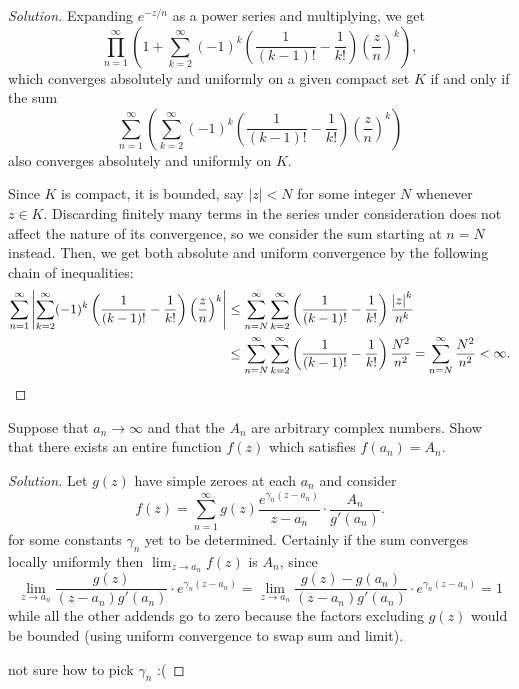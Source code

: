 \documentclass[10pt]{article}
\newenvironment{soln}{\begin{proof}[Solution]}{\end{proof}}
\providecommand{\abs}[1]{\left\lvert #1\right\rvert}
\providecommand{\paren}[1]{\left(#1\right)}
\begin{document}
\begin{soln}
    Expanding $e^{-z/n}$ as a power series and multiplying, we get
    \begin{equation*}
	\prod_{n=1}^\infty \paren{
	    1 + \sum_{k=2}^\infty (-1)^k\paren{\frac 1{(k-1)!} - \frac 1{k!}}
	    \paren{\frac zn}^k
	},
    \end{equation*}
    which converges absolutely and uniformly on a given compact set $K$
    if and only if the sum
    \begin{equation*}
	\sum_{n=1}^\infty
	\paren{\sum_{k=2}^\infty (-1)^k\paren{\frac 1{(k-1)!}
	- \frac 1{k!}} \paren{\frac zn}^k}
    \end{equation*}
    also converges absolutely and uniformly on $K$.

    Since $K$ is compact, it is bounded,
    say $\abs z < N$ for some integer $N$ whenever $z\in K$.
    Discarding finitely many terms in the series under consideration
    does not affect the nature of its convergence, so we consider
    the sum starting at $n = N$ instead. Then,
    we get both absolute and uniform convergence
    by the following chain of inequalities:
    \begin{align*}
	\sum_{n=1}^\infty
	\abs{\sum_{k=2}^\infty (-1)^k\paren{\frac 1{(k-1)!}
	- \frac 1{k!}} \paren{\frac zn}^k}
	&\le \sum_{n=N}^\infty\sum_{k=2}^\infty
	\paren{\frac 1{(k-1)!} - \frac 1{k!}}
	\frac{\abs z^k}{n^k}\\
	&\le \sum_{n=N}^\infty\sum_{k=2}^\infty
	\paren{\frac 1{(k-1)!} - \frac 1{k!}} \frac{N^2}{n^2}
	= \sum_{n=N}^\infty \frac{N^2}{n^2} < \infty.\qedhere
    \end{align*}
\end{soln}

\begin{problem}
    [p.197\#1]
    Suppose that $a_n\to\infty$ and that the $A_n$
    are arbitrary complex numbers. Show that there exists
    an entire function $f(z)$ which satisfies $f(a_n) = A_n$.
\end{problem}

\begin{soln}
    Let $g(z)$ have simple zeroes at each $a_n$ and consider
    \begin{equation*}
	f(z) = \sum_{n=1}^\infty
	g(z)\frac{e^{\gamma_n(z-a_n)}}{z-a_n}\cdot \frac{A_n}{g'(a_n)}.
    \end{equation*}
    for some constants $\gamma_n$ yet to be determined.
    Certainly if the sum converges locally uniformly
    then $\lim_{z\to a_n} f(z)$ is $A_n$, since
    \begin{equation*}
	\lim_{z\to a_n}\frac{g(z)}{(z-a_n)g'(a_n)}\cdot e^{\gamma_n(z-a_n)}
	= \lim_{z\to a_n}\frac{g(z) - g(a_n)}{(z-a_n)g'(a_n)}
	\cdot e^{\gamma_n(z-a_n)}= 1
    \end{equation*}
    while all the other addends go to zero
    because the factors excluding $g(z)$ would be bounded
    (using uniform convergence to swap sum and limit).

    not sure how to pick $\gamma_n$ :(
\end{soln}
\end{document}
